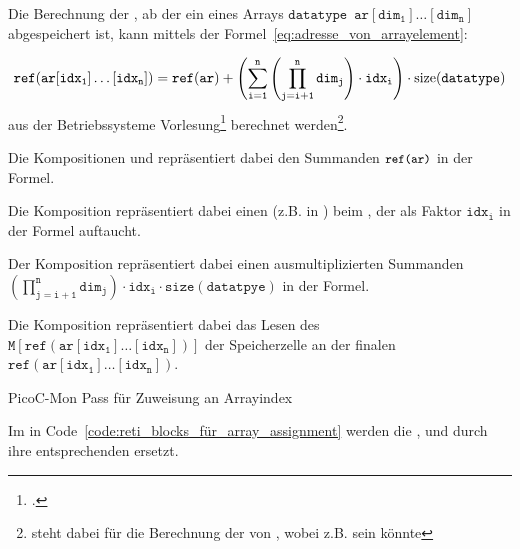 \begin{Special_Paragraph}
  Die Berechnung der , ab der ein  eines Arrays $\mathtt{datatype\enspace ar[dim_1]\ldots[dim_n]}$ abgespeichert ist, kann mittels der Formel~\ref{eq:adresse_von_arrayelement}:


  \begin{equation}
  \mathtt{ref(ar[idx_1]\ldots[idx_n]) = ref(ar) + \left(\sum_{i=1}^{n}\left(\prod_{j=i+1}^{n} dim_{j}\right) \cdot idx_{i}\right) \cdot \operatorname{size}(datatype)} \\
    \label{eq:adresse_von_arrayelement}
  \end{equation}
  aus der Betriebssysteme Vorlesung\footcite{scholl_betriebssysteme_2020} berechnet werden\footnote{ steht dabei für die Berechnung der  von , wobei  z.B.  sein könnte}.

  Die Kompositionen  und  repräsentiert dabei den Summanden ${\small\texttt{ref(ar)}}$ in der Formel.

  Die Komposition  repräsentiert dabei einen  (z.B.  in ) beim , der als Faktor $\mathtt{idx_i}$ in der Formel auftaucht.

  Der Komposition  repräsentiert dabei einen ausmultiplizierten Summanden $\mathtt{\left(\prod_{j=i+1}^{n} dim_{j}\right) \cdot idx_{i} \cdot size(datatpye)}$ in der Formel.

Die Komposition  repräsentiert dabei das Lesen des  $\mathtt{M\left[ref(ar[idx_1]\ldots[idx_n])\right]}$ der Speicherzelle an der finalen   $\mathtt{ref(ar[idx_1]\ldots[idx_n])}$.
\end{Special_Paragraph}

\begin{code}
  \centering
  \caption{PicoC-Mon Pass für Zuweisung an Arrayindex}
  \label{code:picoc_mon_für_array_assignment}
\end{code}

Im  in Code~\ref{code:reti_blocks_für_array_assignment} werden die  ,  und  durch ihre entsprechenden  ersetzt.


